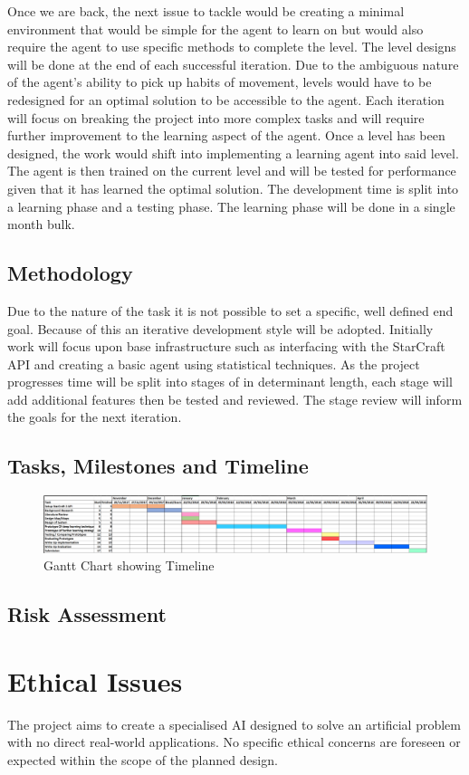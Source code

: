 \documentclass[12pt]{article}
\begin{document}
Once we are back, the next issue to tackle would be creating a minimal
environment that would be simple for the agent to learn on but would also
require the agent to use specific methods to complete the level. The level
designs will be done at the end of each successful iteration. Due to the
ambiguous nature of the agent’s ability to pick up habits of movement,
levels would have to be redesigned for an optimal solution to be accessible
to the agent. Each iteration will focus on breaking the project into more
complex tasks and will require further improvement to the learning aspect of
the agent. Once a level has been designed, the work would shift into
implementing a learning agent into said level. The agent is then trained
on the current level and will be tested for performance given that it has
learned the optimal solution. The development time is split into a learning
phase and a testing phase. The learning phase will be done in a single month bulk.

\subsection{Methodology}

Due to the nature of the task it is not possible to set a specific, well
defined end goal. Because of this an iterative development style will be adopted.
Initially work will focus upon base infrastructure such as interfacing with
the StarCraft API and creating a basic agent using statistical techniques.
As the project progresses time will be split into stages of in determinant length,
each stage will add additional features then be tested and reviewed.
The stage review will inform the goals for the next iteration.

\subsection{Tasks, Milestones and Timeline}

\begin{figure}[h]
    \centering
    \includegraphics[width=1\textwidth]{gantt.png}
    \caption{Gantt Chart showing Timeline}
\end{figure}

\subsection{Risk Assessment}

\appendix
\section{Ethical Issues}
The project aims to create a specialised AI designed to solve an artificial
problem with no direct real-world applications.
No specific ethical concerns are foreseen or expected within the scope of the
planned design.

\printbibliography{}
\end{document}
